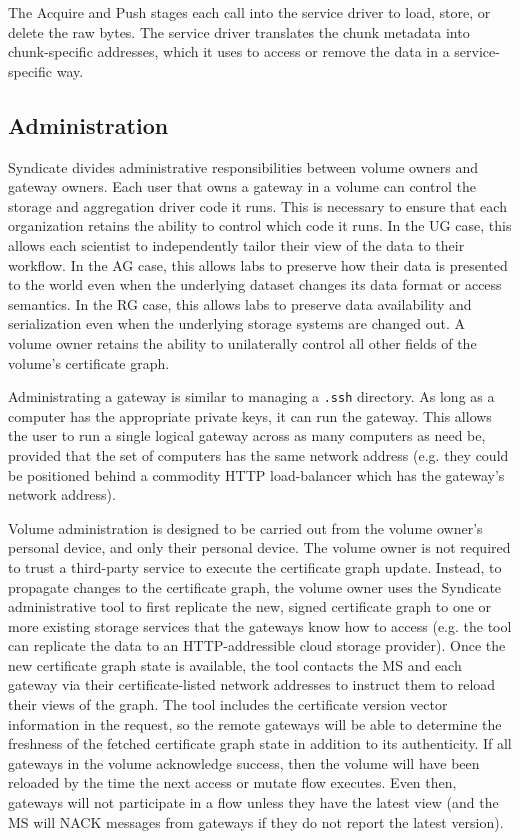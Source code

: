   The Acquire and Push stages each call into
the service driver to load, store, or delete the raw bytes.  The service driver
translates the chunk metadata into chunk-specific addresses, which it uses to
access or remove the data in a service-specific way.

\subsection{Administration}

Syndicate divides administrative responsibilities between volume owners and
gateway owners.  Each user that owns a gateway in a volume can control the
storage and aggregation driver code it runs.  This is necessary to ensure that
each organization retains the ability to control which code it runs.
In the UG case, this allows each
scientist to independently tailor their view of the data to their workflow.  In
the AG case, this allows labs to preserve how their data is presented to the
world even when the underlying dataset changes its data format or access
semantics.  In the RG case, this allows labs to preserve data availability and
serialization even when the underlying storage systems are changed out.
A volume owner retains the ability to unilaterally control all other fields of
the volume's certificate graph.

Administrating a gateway is similar to managing a \texttt{.ssh} directory.  As
long as a computer has the appropriate private keys, it can run the gateway.  This
allows the user to run a single logical gateway across as many computers as need
be, provided that the set of computers has the same network address (e.g. they
could be positioned behind a commodity HTTP load-balancer which has the gateway's network
address).

Volume administration is designed to be carried out from the volume owner's
personal device, and only their personal device.  The volume owner is not
required to trust a third-party service to execute the certificate graph update.
Instead, to propagate changes
to the certificate graph, the volume owner uses the Syndicate
administrative tool to first replicate the new, signed certificate graph to one or more
existing storage services that the gateways know how to access (e.g. the tool
can replicate the data to an HTTP-addressible cloud storage provider).  Once the
new certificate graph state is available, the tool contacts the MS and
each gateway via their certificate-listed network
addresses to instruct them to reload their views of the graph.  The tool includes the
certificate version vector information in the request, so the remote gateways will be able to
determine the freshness of the fetched certificate graph state in addition to
its authenticity.  If all gateways in the volume acknowledge success, then the
volume will have been reloaded by the time the next access or mutate flow
executes.  Even then, gateways will not participate in a flow unless they have
the latest view (and the MS will NACK messages from gateways if they do not
report the latest version).

